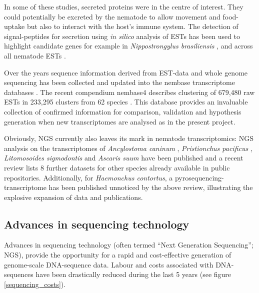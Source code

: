 In some of these studies, secreted proteins were in the centre of
interest. They could potentially be excreted by the nematode to allow
movement and food-uptake but also to interact with the host's immune
system. The detection of signal-peptides for secretion using
\textit{in silico} analysis of ESTs has been used to highlight
candidate genes for example in \textit{Nippostrongylus brasiliensis}
\cite{harcus_signal_2004}, and across all nematode ESTs
\cite{nagaraj_needles_2008}.

Over the years sequence information derived from EST-data and whole
genome sequencing has been collected and updated into the nembase
transcriptome databases
\cite{parkinson_nembase:resource_2004,wasmuth_extent_2008}. The recent
compendium nembase4 describes clustering of 679,480 raw ESTs in
233,295 clusters from 62 species \cite{pmid21550347}. This database
provides an invaluable collection of confirmed information for
comparison, validation and hypothesis generation when new
transcriptomes are analysed as in the present project.

Obviously, NGS currently also leaves its mark in nematode
transcriptomics: NGS analysis on the transcriptomes of
\textit{Ancylostoma caninum} \cite{pmid20470405}, \textit{Pristionchus
  pacificus} \cite{pmid20237107}, \textit{Litomosoides sigmodontis}
\cite{pmid20950480} and \textit{Ascaris suum} \cite{pmid21685128} have
been published and a recent review \cite{pmid22044053} lists 8 further
datasets for other species already available in public
repositories. Additionally, for \textit{Haemonchus contortus}, a
pyrosequencing-transcriptome has been published \cite{pmid20420710}
unnoticed by the above review, illustrating the explosive expansion of
data and publications.

\subsection{Advances in sequencing technology}
\label{sec:ad-seq}

Advances in sequencing technology (often termed ``Next Generation
Sequencing''; NGS), provide the opportunity for a rapid and
cost-effective generation of genome-scale DNA-sequence data. Labour and
costs associated with DNA-sequences have been drastically reduced
during the last 5 years (see figure \ref{sequencing_costs}).


